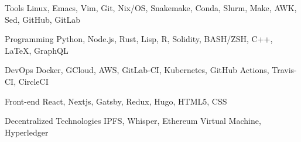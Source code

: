 
\begin{cvskills}

	\cvskill
	{Tools} %
	{Linux, Emacs, Vim, Git, Nix/OS, Snakemake, Conda, Slurm, Make, AWK, Sed, GitHub, GitLab} %

	\cvskill
	{Programming} %
	{Python, Node.js, Rust, Lisp, R, Solidity, BASH/ZSH, C++, LaTeX, GraphQL} %

	\cvskill
	{DevOps} %
	{Docker, GCloud, AWS, GitLab-CI, Kubernetes, GitHub Actions, Travis-CI, CircleCI} %

	\cvskill
	{Front-end} %
	{React, Nextjs, Gatsby, Redux, Hugo, HTML5, CSS} %

	\cvskill
	{Decentralized Technologies} %
	{IPFS, Whisper, Ethereum Virtual Machine, Hyperledger} %


\end{cvskills}
